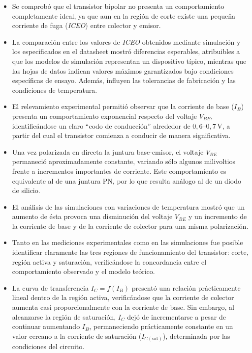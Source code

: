 \documentclass[12pt,a4paper]{article}
\begin{document}
\begin{itemize}

\item Se comprobó que el transistor bipolar no presenta un comportamiento completamente ideal, ya que aun en la región
      de corte existe una pequeña corriente de fuga (\textit{ICEO}) entre colector y emisor.
\item La comparación entre los valores de \textit{ICEO} obtenidos mediante simulación y los especificados en el
      datasheet mostró diferencias esperables, atribuibles a que los modelos de simulación representan un dispositivo
      típico, mientras que las hojas de datos indican valores máximos garantizados bajo condiciones específicas de
      ensayo. Además, influyen las tolerancias de fabricación y las condiciones de temperatura.

\item El relevamiento experimental permitió observar que la corriente de base ($I_B$) presenta un comportamiento
      exponencial respecto del voltaje $V_{BE}$, identificándose un claro ``codo de conducción'' alrededor de
      $0,6$--$0,7\,\mathrm{V}$, a partir del cual el transistor comienza a conducir de manera significativa.

\item Una vez polarizada en directa la juntura base-emisor, el voltaje $V_{BE}$ permaneció aproximadamente constante,
      variando sólo algunos milivoltios frente a incrementos importantes de corriente. Este comportamiento es
      equivalente al de una juntura PN, por lo que resulta análogo al de un diodo de silicio.

\item El análisis de las simulaciones con variaciones de temperatura mostró que un aumento de ésta provoca una
      disminución del voltaje $V_{BE}$ y un incremento de la corriente de base y de la corriente de colector para una
      misma polarización.

\item Tanto en las mediciones experimentales como en las simulaciones fue posible identificar claramente las tres
      regiones de funcionamiento del transistor: corte, región activa y saturación, verificándose la concordancia entre
      el comportamiento observado y el modelo teórico.

\item La curva de transferencia $I_C=f(I_B)$ presentó una relación prácticamente lineal dentro de la región activa,
      verificándose que la corriente de colector aumenta casi proporcionalmente con la corriente de base. Sin embargo,
      al alcanzarse la región de saturación, $I_C$ dejó de incrementarse a pesar de continuar aumentando $I_B$,
      permaneciendo prácticamente constante en un valor cercano a la corriente de saturación ($I_{C(\mathrm{sat})}$),
      determinada por las condiciones del circuito.


\end{itemize}
\end{document}
